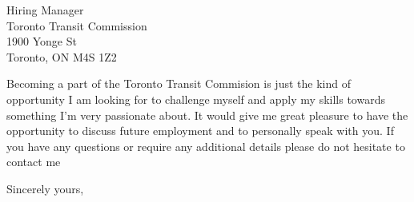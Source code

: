 \documentclass{letter} %
\begin{document}
\begin{letter}{
Hiring Manager \\
Toronto Transit Commission \\
1900 Yonge St \\
Toronto, ON M4S 1Z2}
 
\noindent Becoming a part of the Toronto Transit Commision is just the kind of opportunity I am looking for to challenge myself and apply my skills towards something I’m very passionate about. It would give me great pleasure to have the opportunity to discuss future employment and to personally speak with you. If you have any questions or require any additional details please do not hesitate to contact me
 
\closing{Sincerely yours,} 
 

 
\encl{}  				%

\end{letter}
 
\end{document}
